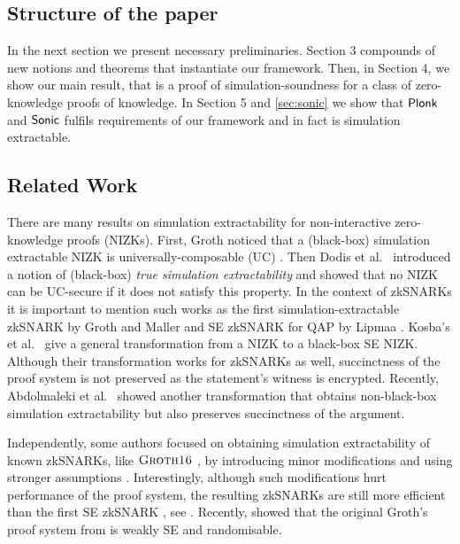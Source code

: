 \documentclass[runningheads,11pt]{llncs}
\theoremstyle{definition} \newtheorem{definition}[theorem]{Definition}
\begin{document}



\subsection{Structure of the paper}
In the next section we present necessary preliminaries. Section 3 compounds of
new notions and theorems that instantiate our framework. Then, in Section 4, we
show our main result, that is a proof of simulation-soundness for a class of
zero-knowledge proofs of knowledge. In Section 5 and \cref{sec:sonic} we show
that $\textnormal{\textsf{Plonk}}$ and ${\textnormal{\textsf{Sonic}}}$ fulfils requirements of our framework and in fact is
simulation extractable.



\subsection{Related Work}
There are many results on simulation extractability for non-interactive
zero-knowledge proofs (NIZKs). First, Groth \cite{AC:Groth07} noticed that a
(black-box) simulation extractable NIZK is universally-composable (UC)
\cite{EPRINT:Canetti00}. Then Dodis et al.~\cite{AC:DHLW10} introduced a notion
of (black-box) \emph{true simulation extractability} and showed that no NIZK can
be UC-secure if it does not satisfy this property. In the context of zkSNARKs it is
important to mention such works as the first simulation-extractable zkSNARK by
Groth and Maller \cite{C:GroMal17} and SE zkSNARK for QAP by Lipmaa
\cite{EPRINT:Lipmaa19a}. Kosba's et al.~\cite{EPRINT:KZMQCP15} give a general
transformation from a NIZK to a black-box SE NIZK. Although their transformation
works for zkSNARKs as well, succinctness of the proof system is not preserved as
the statement's witness is encrypted. Recently, Abdolmaleki et
al.~\cite{CCS:AbdRamSla20} showed another transformation that obtains
non-black-box simulation extractability but also preserves succinctness of the
argument.

Independently, some authors focused on obtaining simulation extractability of
known zkSNARKs, like $\textsc{Groth16}$ \cite{EC:Groth16}, by introducing minor
modifications and using stronger assumptions
\cite{EPRINT:BowGab18,EPRINT:AtaBag19}. Interestingly, although such
modifications hurt performance of the proof system, the resulting zkSNARKs are
still more efficient than the first SE zkSNARK \cite{C:GroMal17}, see
\cite{EPRINT:AtaBag19}. Recently, \cite{EPRINT:BKSV20} showed that the original
Groth's proof system from \cite{EC:Groth16} is weakly SE and randomisable.
\end{document}

